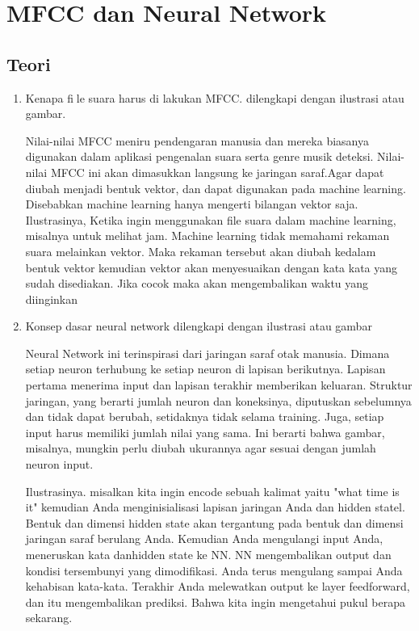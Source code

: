 \chapter{MFCC dan Neural Network}

\section{Teori}
\begin{enumerate}
\item Kenapa file suara harus di lakukan MFCC. dilengkapi dengan ilustrasi atau gambar. 
\par Nilai-nilai MFCC meniru pendengaran manusia dan mereka biasanya digunakan dalam aplikasi pengenalan suara serta genre musik
deteksi. Nilai-nilai MFCC ini akan dimasukkan langsung ke jaringan saraf.Agar dapat diubah menjadi bentuk vektor, dan dapat digunakan pada machine learning. Disebabkan machine learning hanya mengerti bilangan vektor saja.
Ilustrasinya, Ketika ingin menggunakan file suara dalam machine learning, misalnya untuk melihat jam. Machine learning tidak memahami rekaman suara melainkan vektor. Maka rekaman tersebut akan diubah kedalam bentuk vektor kemudian vektor akan menyesuaikan dengan kata kata yang sudah disediakan. Jika cocok maka akan mengembalikan waktu yang diinginkan

\item Konsep dasar neural network dilengkapi dengan ilustrasi atau gambar
\par Neural Network ini terinspirasi dari jaringan saraf otak manusia. Dimana setiap neuron terhubung ke setiap neuron di lapisan berikutnya. Lapisan pertama menerima input dan lapisan terakhir memberikan keluaran. Struktur jaringan, yang berarti jumlah neuron dan koneksinya, diputuskan sebelumnya dan tidak dapat berubah, setidaknya tidak selama training. Juga, setiap input harus memiliki jumlah nilai yang sama. Ini berarti bahwa gambar, misalnya, mungkin perlu diubah ukurannya agar sesuai dengan jumlah neuron input.

Ilustrasinya. misalkan kita ingin encode sebuah kalimat yaitu "what time is it" kemudian Anda menginisialisasi lapisan jaringan Anda dan hidden statel. Bentuk dan dimensi hidden state akan tergantung pada bentuk dan dimensi jaringan saraf berulang Anda. Kemudian Anda mengulangi input Anda, meneruskan kata danhidden state ke NN. NN mengembalikan output dan kondisi tersembunyi yang dimodifikasi. Anda terus mengulang sampai Anda kehabisan kata-kata. Terakhir Anda melewatkan output ke layer feedforward, dan itu mengembalikan prediksi. Bahwa kita ingin mengetahui pukul berapa sekarang.


\end{enumerate}
